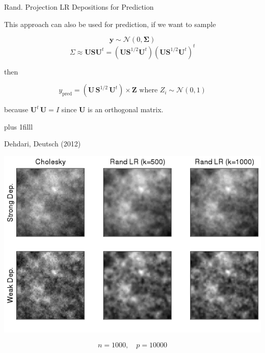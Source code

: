 \documentclass[11pt,ignorenonframetext,]{beamer}
\newcommand{\vvfill}{\vskip0pt plus 1filll}
\begin{document}
\begin{frame}[t]{Rand. Projection LR Depositions for Prediction}
\protect\hypertarget{rand.-projection-lr-depositions-for-prediction}{}

\small

This approach can also be used for prediction, if we want to sample

\[\symbf{y} \sim \mathcal{N}(0,\symbf{\Sigma})\] \[
\Sigma \approx \symbf{U} \symbf{S} \symbf{U}^t = (\symbf{U} \symbf{S}^{1/2} \symbf{U}^t)(\symbf{U} \symbf{S}^{1/2} \symbf{U}^t)^t 
\]

then

\[
y_{\text{pred}} = (\symbf{U}\, \symbf{S}^{1/2}\,\symbf{U}^t) \times \symbf{Z} \text{ where } Z_i \sim \mathcal{N}(0,1)
\]

because \(\symbf{U}^t \, \symbf{U} = I\) since \(\symbf{U}\) is an
orthogonal matrix.

\vvfill

\begin{center}
\footnotesize
Dehdari, Deutsch (2012)
\end{center}

\end{frame}

\begin{frame}{}
\protect\hypertarget{section-2}{}

\vspace{5mm}

\begin{center}
\includegraphics[width=\textwidth]{figs/RandLRPred.png}
\end{center}

\[ n=1000, \quad p=10000 \]

\end{frame}
\end{document}
